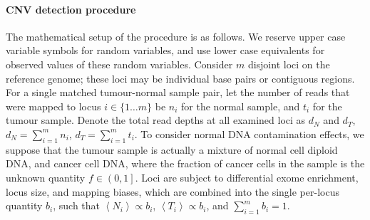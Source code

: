 \documentclass[thesis.tex]{subfiles}
\begin{document}
\paragraph{\Acrshort{CNV} detection procedure}

The mathematical setup of the procedure is as follows.  We reserve upper case variable symbols for random variables, and use lower case equivalents for observed values of these random variables.  Consider $m$ disjoint loci on the reference genome; these loci may be individual base pairs or contiguous regions.  For a single matched tumour-normal sample pair, let the number of reads that were mapped to locus $i \in \{1 \dots m\}$ be $n_i$ for the normal sample, and $t_i$ for the tumour sample.  Denote the total read depths at all examined loci as $d_N$ and $d_T$, $d_N = \sum_{i=1}^{m} n_i$, $d_T = \sum_{i=1}^{m} t_i$. To consider normal DNA contamination effects, we suppose that the tumour sample is actually a mixture of normal cell diploid DNA, and cancer cell DNA, where the fraction of cancer cells in the sample is the unknown quantity $f \in \left(0, 1\right]$.  Loci are subject to differential exome enrichment, locus size, and mapping biases, which are combined into the single per-locus quantity $b_i$, such that $\left<N_i\right> \propto b_i$, $\left<T_i\right> \propto b_i$, and $\sum_{i=1}^{m} b_i = 1$.
\end{document}

